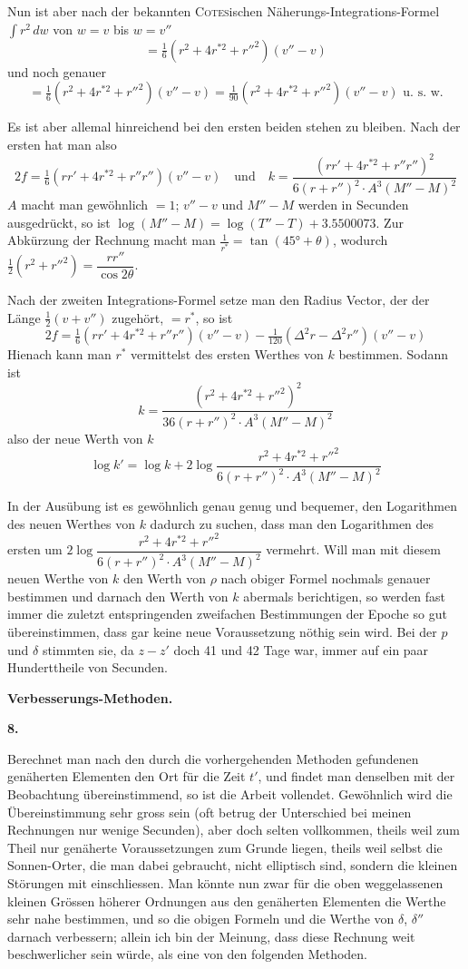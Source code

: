 \documentclass[10pt,a4paper]{article}
\begin{document}
Nun ist aber nach der bekannten \textsc{Cotes}ischen Näherungs-Integrations-Formel $\int r^2\,dw$ von $w = v$ bis $w = v''$
\[
= \tfrac{1}{6}(r^2 + 4r^{*2} + r''^2)(v'' - v)
\]
und noch genauer
\[
= \tfrac{1}{6}(r^2 + 4r^{*2} + r''^2)(v'' - v) = \tfrac{1}{90}(r^2 + 4r^{*2} + r''^2)(v'' - v) \text{ u. s. w.}
\]

\clearpage
\noindent
Es ist aber allemal hinreichend bei den ersten beiden stehen zu bleiben. Nach der ersten hat man also
\[
2f = \tfrac{1}{6}(rr' + 4r^{*2} + r''r'')(v'' - v) \quad \text{und} \quad k = \frac{(rr' + 4r^{*2} + r''r'')^2}{6(r + r'')^2 \cdot A^3(M'' - M)^2}
\]
$A$ macht man gewöhnlich $= 1$; $v'' - v$ und $M'' - M$ werden in Secunden ausgedrückt, so ist $\log(M'' - M) = \log(T'' - T) + 3.5500073$. Zur Abkürzung der Rechnung macht man $\tfrac{1}{r^*} = \tan(45° + \theta)$, wodurch $\tfrac{1}{2}(r^2 + r''^2) = \dfrac{rr''}{\cos 2\theta}$.

Nach der zweiten Integrations-Formel setze man den Radius Vector, der der Länge $\tfrac{1}{2}(v + v'')$ zugehört, $= r^*$, so ist
\[
2f = \tfrac{1}{6}(rr' + 4r^{*2} + r''r'')(v'' - v) - \tfrac{1}{120}(\Delta^2r - \Delta^2r'')(v'' - v)
\]
Hienach kann man $r^*$ vermittelst des ersten Werthes von $k$ bestimmen. Sodann ist
\[
k = \frac{(r^2 + 4r^{*2} + r''^2)^2}{36(r + r'')^2 \cdot A^3(M'' - M)^2}
\]
also der neue Werth von $k$
\[
\log k' = \log k + 2\log\frac{r^2 + 4r^{*2} + r''^2}{6(r + r'')^2 \cdot A^3(M'' - M)^2}
\]

In der Ausübung ist es gewöhnlich genau genug und bequemer, den Logarithmen des neuen Werthes von $k$ dadurch zu suchen, dass man den Logarithmen des ersten um $2\log\dfrac{r^2 + 4r^{*2} + r''^2}{6(r + r'')^2 \cdot A^3(M'' - M)^2}$ vermehrt. Will man mit diesem neuen Werthe von $k$ den Werth von $\rho$ nach obiger Formel nochmals genauer bestimmen und darnach den Werth von $k$ abermals berichtigen, so werden fast immer die zuletzt entspringenden zweifachen Bestimmungen der Epoche so gut übereinstimmen, dass gar keine neue Voraussetzung nöthig sein wird. Bei der $p$ und $\delta$ stimmten sie, da $z - z'$ doch 41 und 42 Tage war, immer auf ein paar Hunderttheile von Secunden.

\medskip
\noindent
\textbf{Verbesserungs-Methoden.}

\medskip
\noindent
\textbf{8.}

\medskip
\noindent
Berechnet man nach den durch die vorhergehenden Methoden gefundenen genäherten Elementen den Ort für die Zeit $t'$, und findet man denselben mit der Beobachtung übereinstimmend, so ist die Arbeit vollendet. Gewöhnlich wird die Übereinstimmung sehr gross sein (oft betrug der Unterschied bei meinen Rechnungen nur wenige Secunden), aber doch selten vollkommen, theils weil zum Theil nur genäherte Voraussetzungen zum Grunde liegen, theils weil selbst die Sonnen-Orter, die man dabei gebraucht, nicht elliptisch sind, sondern die kleinen Störungen mit einschliessen. Man könnte nun zwar für die oben weggelassenen kleinen Grössen höherer Ordnungen aus den genäherten Elementen die Werthe sehr nahe bestimmen, und so die obigen Formeln und die Werthe von $\delta$, $\delta''$ darnach verbessern; allein ich bin der Meinung, dass diese Rechnung weit beschwerlicher sein würde, als eine von den folgenden Methoden.
\end{document}
